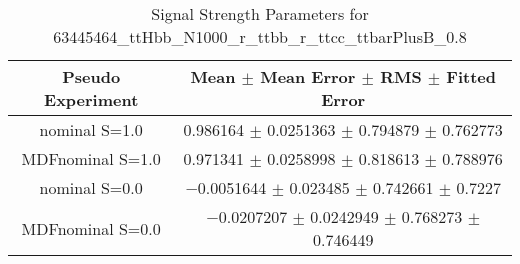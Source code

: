 \begin{table}
\centering
\caption{Signal Strength Parameters for 63445464\_ttHbb\_N1000\_r\_ttbb\_r\_ttcc\_ttbarPlusB\_0.8}
\begin{tabular}{cc}
\toprule
Pseudo Experiment & Mean $\pm$ Mean Error $\pm$ RMS $\pm$ Fitted Error\\
\midrule
nominal S=1.0 & \num{0.986164} $\pm$ \num{0.0251363} $\pm$ \num{0.794879} $\pm$ \num{0.762773}\\
MDFnominal S=1.0 & \num{0.971341} $\pm$ \num{0.0258998} $\pm$ \num{0.818613} $\pm$ \num{0.788976}\\
nominal S=0.0 & \num{-0.0051644} $\pm$ \num{0.023485} $\pm$ \num{0.742661} $\pm$ \num{0.7227}\\
MDFnominal S=0.0 & \num{-0.0207207} $\pm$ \num{0.0242949} $\pm$ \num{0.768273} $\pm$ \num{0.746449}\\
\bottomrule
\end{tabular}
\end{table}